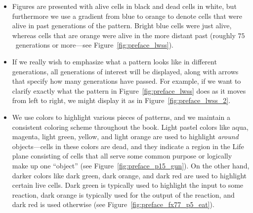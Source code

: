 \begin{itemize}
	\item Figures are presented with alive cells in black and dead cells in white, but furthermore we use a gradient from blue to orange to denote cells that were alive in past generations of the pattern. Bright blue cells were just alive, whereas cells that are orange were alive in the more distant past (roughly $75$~generations or more---see Figure~\ref{fig:preface_lwss}).\bigskip

	\noindent\begin{minipage}{\linewidth}
		\centering{}
		\label{fig:preface_lwss}\bigskip
	\end{minipage}
	
	\item If we really wish to emphasize what a pattern looks like in different generations, all generations of interest will be displayed, along with arrows that specify how many generations have passed. For example, if we want to clarify exactly what the pattern in Figure~\ref{fig:preface_lwss} does as it moves from left to right, we might display it as in Figure~\ref{fig:preface_lwss_2}.\bigskip
	
	\noindent\begin{minipage}{\linewidth}
		\centering{}
		\label{fig:preface_lwss_2}\bigskip
	\end{minipage}

	\item We use colors to highlight various pieces of patterns, and we maintain a consistent coloring scheme throughout the book. Light pastel colors like aqua, magenta, light green, yellow, and light orange are used to highlight \emph{around} objects---cells in these colors are dead, and they indicate a region in the Life plane consisting of cells that all serve some common purpose or logically make up one ``object'' (see Figure~\ref{fig:preface_p15_gun}). On the other hand, darker colors like dark green, dark orange, and dark red are used to highlight certain live cells. Dark green is typically used to highlight the input to some reaction, dark orange is typically used for the output of the reaction, and dark red is used otherwise (see Figure~\ref{fig:preface_fx77_p5_eat}).\bigskip
	

\end{itemize}

